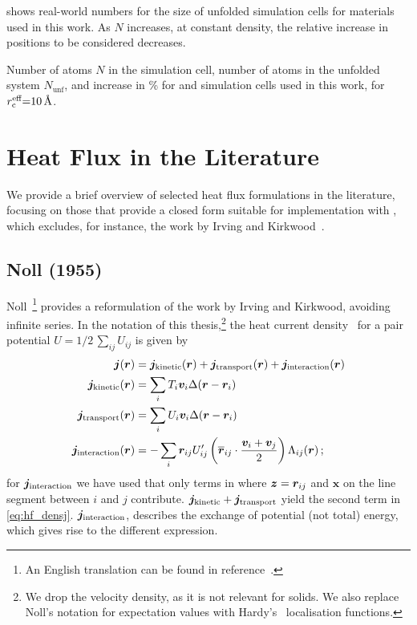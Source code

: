  shows real-world numbers for the size of unfolded simulation cells for materials used in this work. As $N$ increases, at constant density, the relative increase in positions to be considered decreases.

\begin{table}
  \caption{Number of atoms $N$ in the simulation cell, number of atoms in the unfolded system $N_{\text{unf}}$, and increase in \unit{\percent} for  and  simulation cells used in this work, for $r_{\text{c}}^{\text{eff}}{=}\qty{10}{\angstrom}$.}
  \label{tab:si-unf_n_atoms}
  
\end{table}


\section{Heat Flux in the Literature}
\label{sec:si-heat_flux_literature}

We provide a brief overview of selected heat flux formulations in the literature, focusing on those that provide a closed form suitable for implementation with \md, which excludes, for instance, the work by Irving and Kirkwood~\cite{ik1950t}.

\subsection{Noll (1955)}

Noll~\cite{n1955t}\footnote{An English translation can be found in reference~\cite{lv2010t}.} provides a reformulation of the work by Irving and Kirkwood, avoiding infinite series. In the notation of this thesis,\footnote{We drop the velocity density, as it is not relevant for solids. We also replace Noll's notation for expectation values with Hardy's~\cite{h1982t} localisation functions.} the heat current density~\cite[eq.~2.13-2.16]{n1955t} for a pair potential $U = 1/2 \, \sum_{ij}\nolimits U_{ij}$ is given by
\begin{align}
	\boldsymbol{j}(\boldsymbol{r}) &= \boldsymbol{j}_{\text{kinetic}}(\boldsymbol{r}) + \boldsymbol{j}_{\text{transport}}(\boldsymbol{r}) + \boldsymbol{j}_{\text{interaction}}(\boldsymbol{r}) \\
	\boldsymbol{j}_{\text{kinetic}}(\boldsymbol{r}) &= \sum_i T_i \boldsymbol{v}_i \Delta(\boldsymbol{r} - \boldsymbol{r}_i) \\
	\boldsymbol{j}_{\text{transport}}(\boldsymbol{r}) &= \sum_i U_i \boldsymbol{v}_i \Delta(\boldsymbol{r} - \boldsymbol{r}_i) \\
	\boldsymbol{j}_{\text{interaction}}(\boldsymbol{r}) &= - \sum_i \boldsymbol{r}_{ij} U'_{ij} \left(\overline{\boldsymbol{{r}}}_{ij} \cdot \frac{\boldsymbol{v}_i + \boldsymbol{v}_j}{2}\right) \Lambda_{ij}(\boldsymbol{r}) \,;
\end{align}
for $\boldsymbol{j}_{\text{interaction}}$ we have used that only terms in \cite[eq.~2.16]{n1955t} where $\boldsymbol{z} = \boldsymbol{r}_{ij}$ and $\boldsymbol{x}$ on the line segment between $i$ and $j$ contribute.
$\boldsymbol{j}_{\text{kinetic}}+\boldsymbol{j}_{\text{transport}}$ yield the second term in \cref{eq:hf_densj}. $\boldsymbol{j}_{\text{interaction}}$, describes the exchange of potential (not total) energy, which gives rise to the different expression.


